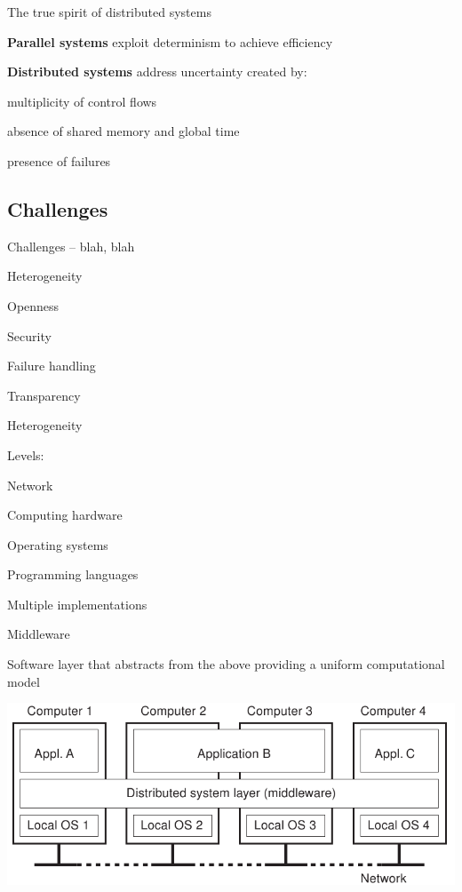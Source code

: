 \begin{frame}{The true spirit of distributed systems}
	
\BI
\item \textbf{Parallel systems} exploit determinism to achieve efficiency
\bigskip
\item \textbf{Distributed systems} address uncertainty created by:
\BI
\item multiplicity of control flows
\item absence of shared memory and global time
\item presence of failures	
\EI
\EI
\end{frame}

\subsection{Challenges}

\begin{frame}{Challenges -- blah, blah}

\BI
\item Heterogeneity
\item Openness
\item Security
\item Failure handling
\item Transparency
\EI

\end{frame}

\begin{frame}{Heterogeneity}

Levels:
\BI
\item Network
\item Computing hardware
\item Operating systems
\item Programming languages
\item Multiple implementations
\EI

\begin{block}{Middleware}
\begin{minipage}{0.45\textwidth}
Software layer that abstracts from the above providing 
a uniform computational model
\end{minipage}
\hfill
\begin{minipage}{0.45\textwidth}
\includegraphics[width=\textwidth]{middleware.png}
\end{minipage}

\end{block}


\end{frame}


